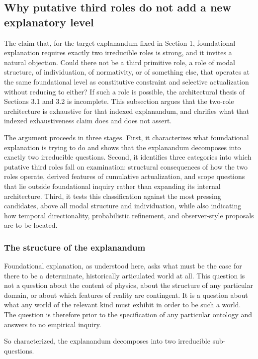 \documentclass[11pt]{article}
\theoremstyle{foundation}
\begin{document}
\subsection{Why putative third roles do not add a new explanatory level}

The claim that, for the target explanandum fixed in Section 1, foundational explanation requires exactly two irreducible roles is strong, and it invites a natural objection. Could there not be a third primitive role, a role of modal structure, of individuation, of normativity, or of something else, that operates at the same foundational level as constitutive constraint and selective actualization without reducing to either? If such a role is possible, the architectural thesis of Sections 3.1 and 3.2 is incomplete. This subsection argues that the two-role architecture is exhaustive for that indexed explanandum, and clarifies what that indexed exhaustiveness claim does and does not assert.

The argument proceeds in three stages. First, it characterizes what foundational explanation is trying to do and shows that the explanandum decomposes into exactly two irreducible questions. Second, it identifies three categories into which putative third roles fall on examination: structural consequences of how the two roles operate, derived features of cumulative actualization, and scope questions that lie outside foundational inquiry rather than expanding its internal architecture. Third, it tests this classification against the most pressing candidates, above all modal structure and individuation, while also indicating how temporal directionality, probabilistic refinement, and observer-style proposals are to be located.

\subsubsection{The structure of the explanandum}

Foundational explanation, as understood here, asks what must be the case for there to be a determinate, historically articulated world at all. This question is not a question about the content of physics, about the structure of any particular domain, or about which features of reality are contingent. It is a question about what any world of the relevant kind must exhibit in order to be such a world. The question is therefore prior to the specification of any particular ontology and answers to no empirical inquiry.

So characterized, the explanandum decomposes into two irreducible sub-questions.
\end{document}
